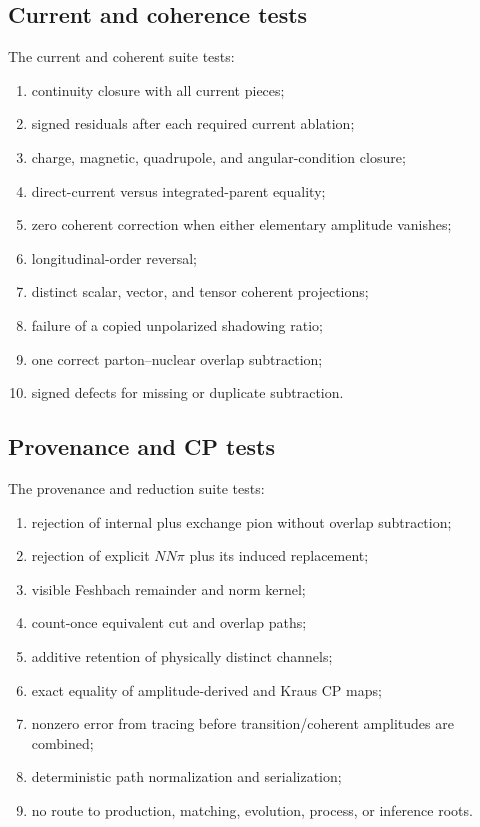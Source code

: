 \documentclass[11pt]{article}
\begin{document}
\subsection{Current and coherence tests}

The current and coherent suite tests:
\begin{enumerate}
\item continuity closure with all current pieces;
\item signed residuals after each required current ablation;
\item charge, magnetic, quadrupole, and angular-condition closure;
\item direct-current versus integrated-parent equality;
\item zero coherent correction when either elementary amplitude vanishes;
\item longitudinal-order reversal;
\item distinct scalar, vector, and tensor coherent projections;
\item failure of a copied unpolarized shadowing ratio;
\item one correct parton--nuclear overlap subtraction;
\item signed defects for missing or duplicate subtraction.
\end{enumerate}

\subsection{Provenance and CP tests}

The provenance and reduction suite tests:
\begin{enumerate}
\item rejection of internal plus exchange pion without overlap subtraction;
\item rejection of explicit \(NN\pi\) plus its induced replacement;
\item visible Feshbach remainder and norm kernel;
\item count-once equivalent cut and overlap paths;
\item additive retention of physically distinct channels;
\item exact equality of amplitude-derived and Kraus CP maps;
\item nonzero error from tracing before transition/coherent amplitudes are
combined;
\item deterministic path normalization and serialization;
\item no route to production, matching, evolution, process, or inference
roots.
\end{enumerate}
\end{document}
